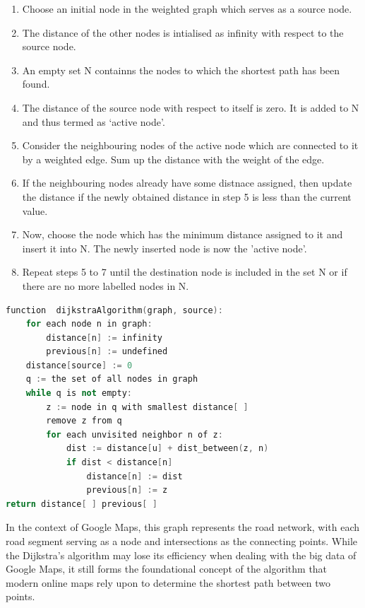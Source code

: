 \documentclass[10pt,oneside,english,a4paper]{article}
\begin{document}
\begin{enumerate}
	\item Choose an initial node in the weighted graph which serves as a source node.
	\item The distance of the other nodes is intialised as infinity with respect to the source node. 
	\item An empty set N containns the nodes to which the shortest path has been found. 
	\item The distance of the source node with respect to itself is zero. It is added to N and thus termed as ‘active node’. 
	\item Consider the neighbouring nodes of the active node which are connected to it by a weighted edge. Sum up the distance with the weight of the edge. 
	\item If the neighbouring nodes already have some distnace assigned, then update the distance if the newly obtained distance in step 5 is less than the current value. 
	\item Now, choose the node which has the minimum distance assigned to it and insert it into N. The newly inserted node is now the ’active node’. 
	\item Repeat steps 5 to 7 until the destination node is included in the set N or if there are no more labelled nodes in N.
	
\end{enumerate}

\begin{lstlisting}[language=C++, caption=Pseudo code representation, frame =single, basicstyle=\ttfamily\small]
function  dijkstraAlgorithm(graph, source):
	for each node n in graph:
		distance[n] := infinity
		previous[n] := undefined
	distance[source] := 0
	q := the set of all nodes in graph
	while q is not empty:
		z := node in q with smallest distance[ ]
		remove z from q
		for each unvisited neighbor n of z:
			dist := distance[u] + dist_between(z, n)
			if dist < distance[n]
				distance[n] := dist
				previous[n] := z
return distance[ ] previous[ ]

\end{lstlisting}
In the context of Google Maps, this graph represents the road network, with each road segment serving as a node and intersections as the connecting points. While the Dijkstra's algorithm may lose its efficiency when dealing with the big data of Google Maps, it still forms the foundational concept of the algorithm that modern online maps rely upon to determine the shortest path between two points.
\end{document}
